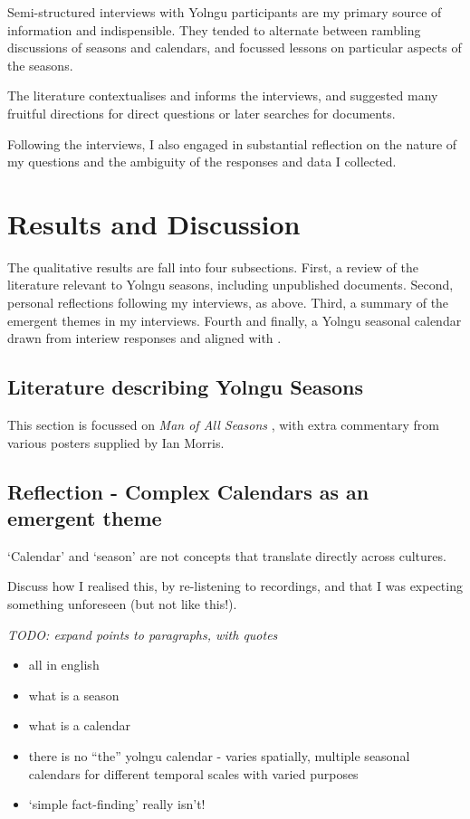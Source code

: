 Semi-structured interviews with Yolngu participants are my primary source of information and indispensible.
They tended to alternate between rambling discussions of seasons and calendars,
and focussed lessons on particular aspects of the seasons.

The literature contextualises and informs the interviews, and suggested many fruitful
directions for direct questions or later searches for documents.

Following the interviews, I also engaged in substantial reflection on the nature of
my questions and the ambiguity of the responses and data I collected.



\section{Results and Discussion}

The qualitative results are fall into four subsections.
First, a review of the literature relevant to Yolngu seasons, including unpublished documents.
Second, personal reflections following my interviews, as above.
Third, a summary of the emergent themes in my interviews.
Fourth and finally, a Yolngu seasonal calendar drawn from interiew responses and aligned with \citet{davis1989}.


\subsection{Literature describing Yolngu Seasons}
This section is focussed on \textit{Man of All Seasons} \citep{davis1989},
with extra commentary from various posters supplied by Ian Morris.


\subsection{Reflection - Complex Calendars as an emergent theme}

`Calendar' and `season' are not concepts that translate directly across cultures. 

Discuss how I realised this, by re-listening to recordings, and that I was expecting something unforeseen (but not like this!).  

\emph{TODO: expand points to paragraphs, with quotes}

\begin{itemize}
\item all in english
\item what is a season
\item what is a calendar
\item there is no ``the'' yolngu calendar - varies spatially,
        multiple seasonal calendars for different temporal scales with varied purposes
\item `simple fact-finding' really isn't!
\end{itemize}



